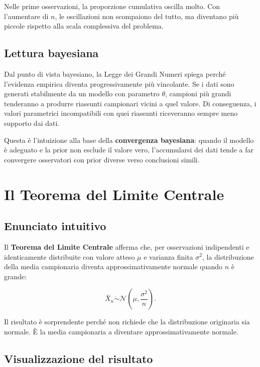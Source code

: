 \documentclass[
  italian,
  letterpaper,
  a4paper,
  11pt,
  open=any]{scrbook}
\theoremstyle{plain}
\theoremstyle{definition}
\theoremstyle{definition}
\theoremstyle{remark}
\begin{document}
Nelle prime osservazioni, la proporzione cumulativa oscilla molto. Con
l'aumentare di \(n\), le oscillazioni non scompaiono del tutto, ma
diventano più piccole rispetto alla scala complessiva del problema.

\subsection{Lettura bayesiana}\label{lettura-bayesiana}

Dal punto di vista bayesiano, la Legge dei Grandi Numeri spiega perché
l'evidenza empirica diventa progressivamente più vincolante. Se i dati
sono generati stabilmente da un modello con parametro \(\theta\),
campioni più grandi tenderanno a produrre riassunti campionari vicini a
quel valore. Di conseguenza, i valori parametrici incompatibili con quei
riassunti riceveranno sempre meno supporto dai dati.

Questa è l'intuizione alla base della \textbf{convergenza bayesiana}:
quando il modello è adeguato e la prior non esclude il valore vero,
l'accumularsi dei dati tende a far convergere osservatori con prior
diverse verso conclusioni simili.

\section{Il Teorema del Limite Centrale}\label{sec-clt-evidence}

\subsection{Enunciato intuitivo}\label{enunciato-intuitivo-1}

Il \textbf{Teorema del Limite Centrale} afferma che, per osservazioni
indipendenti e identicamente distribuite con valore atteso \(\mu\) e
varianza finita \(\sigma^2\), la distribuzione della media campionaria
diventa approssimativamente normale quando \(n\) è grande:

\[
\bar{X}_n \dot\sim \mathcal{N}\left(\mu, \frac{\sigma^2}{n}\right).
\]

Il risultato è sorprendente perché non richiede che la distribuzione
originaria sia normale. È la media campionaria a diventare
approssimativamente normale.

\subsection{Visualizzazione del
risultato}\label{visualizzazione-del-risultato}
\end{document}
